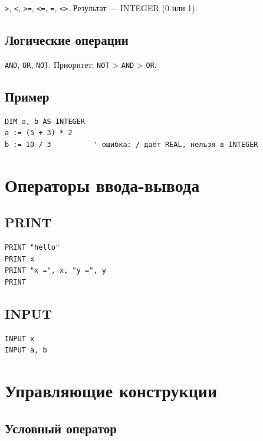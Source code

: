 \documentclass[14pt,a4paper]{article}
\begin{document}
\texttt{>}, \texttt{<}, \texttt{>=}, \texttt{<=}, \texttt{=},
\texttt{<>}. Результат — INTEGER (0 или 1).

\subsection{Логические операции}

\texttt{AND}, \texttt{OR}, \texttt{NOT}. Приоритет:
\texttt{NOT} > \texttt{AND} > \texttt{OR}.

\subsection{Пример}

\begin{lstlisting}[language={},numbers=none]
DIM a, b AS INTEGER
a := (5 + 3) * 2
b := 10 / 3          ' ошибка: / даёт REAL, нельзя в INTEGER
\end{lstlisting}

\section{Операторы ввода-вывода}

\subsection{PRINT}

\begin{lstlisting}[language={},numbers=none]
PRINT "hello"
PRINT x
PRINT "x =", x, "y =", y
PRINT
\end{lstlisting}

\subsection{INPUT}

\begin{lstlisting}[language={},numbers=none]
INPUT x
INPUT a, b
\end{lstlisting}

\section{Управляющие конструкции}

\subsection{Условный оператор}
\end{document}
